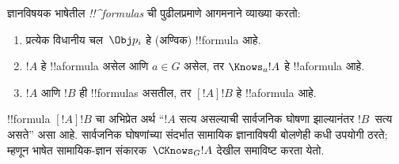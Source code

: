 \documentclass[../../../include/open-logic-section]{subfiles}
\begin{document}
\begin{defn}
  ज्ञानविषयक भाषेतील \emph{!!^{formula}s} ची पुढीलप्रमाणे
  आगमनाने व्याख्या करतो:
  \begin{enumerate}


  \item प्रत्येक विधानीय चल~$\Obj p_i$ हे (अण्विक)
  !!{formula} आहे.






  \item $!A$ हे !!a{formula} असेल आणि $a \in G$ असेल,
  तर $\Knows_a !A$ हे !!a{formula} आहे.

  \item $!A$ आणि $!B$ ही !!{formula}s असतील,
  तर $[!A] !B$ हे !!a{formula} आहे.

\end{enumerate}
\end{defn}

!!{formula} $[!A] !B$ चा अभिप्रेत अर्थ ``$!A$ सत्य
असल्याची सार्वजनिक घोषणा झाल्यानंतर $!B$~सत्य असते''
असा आहे. सार्वजनिक घोषणांच्या संदर्भात सामायिक
ज्ञानाविषयी बोलणेही कधी उपयोगी ठरते; म्हणून भाषेत
सामायिक-ज्ञान संकारक~$\CKnows_G
!A$ देखील समाविष्ट करता येतो.
\end{document}
